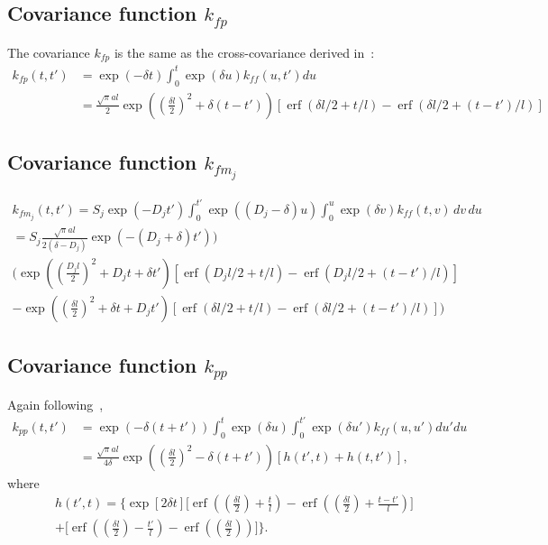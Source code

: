 \documentclass{article}
\newcommand{\erf}{\operatorname{erf}}
\begin{document}
\subsection{Covariance function $k_{fp}$}

The covariance $k_{fp}$ is the same as the cross-covariance derived
in~\cite{Lawrence2007}:
\begin{align*}
  k_{fp}(t, t') &= \exp(-\delta t) \int_0^{t} \exp(\delta u) k_{ff}(u, t') du \\
   &= \frac{\sqrt{\pi}al}{2} \exp\left(\left(\frac{\delta l}{2}\right)^2 + \delta (t - t') \right)
   [\erf(\delta l / 2 + t/l) - \erf(\delta l / 2 + (t-t')/l)]
\end{align*}

\subsection{Covariance function $k_{fm_j}$}

\begin{multline}
  k_{f m_j}(t, t') = S_j \exp(-D_j t') \int_0^{t'}
  \exp((D_j - \delta) u) \int_0^u \exp(\delta v) k_{ff}(t, v)\, dv\, du \\
  = S_j \frac{\sqrt{\pi} al}{2(\delta - D_j)} \exp(-(D_j+\delta) t')) \\
  \bigg(
  \exp\left(\left(\frac{D_j l}{2}\right)^2 + D_j t + \delta t' \right)
  [\erf(D_j l / 2 + t/l) - \erf(D_j l / 2 + (t-t')/l)] \\
  -
  \exp\left(\left(\frac{\delta l}{2}\right)^2 + \delta t + D_j t'\right)
  [\erf(\delta l / 2 + t/l) - \erf(\delta l / 2 + (t-t')/l)]
  \bigg)
\end{multline}

\subsection{Covariance function $k_{pp}$}

Again following~\cite{Lawrence2007},
\begin{align*}
  k_{p p}(t, t') &= \exp(-\delta (t +t')) \int_0^t \exp(\delta u)
  \int_0^{t'} \exp(\delta u') k_{ff}(u, u') du' du \\
  &= \frac{\sqrt{\pi}al}{4 \delta}
  \exp\left(\left(\frac{\delta l}{2}\right)^2 -\delta (t + t')\right) [ h(t', t) +
  h(t, t')],
\end{align*}
where
\begin{multline}
  \label{eq:gpsim_h}
  h(t', t) = 
  \bigg\{ \exp[2 \delta t ] \bigg[
       \erf\left(\left(\frac{\delta l}{2}\right) + \frac{t}{l} \right) - 
       \erf\left(\left(\frac{\delta l}{2}\right) + \frac{t-t'}{l} \right) \bigg] \\
  + \bigg[
       \erf\left(\left(\frac{\delta l}{2}\right) - \frac{t'}{l} \right) -
       \erf\left(\left(\frac{\delta l}{2}\right) \right) \bigg] \bigg\}.
\end{multline}
\end{document}
